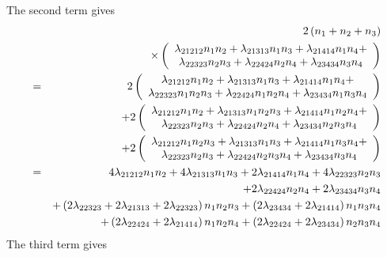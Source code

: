 \documentclass[12pt]{article}
\begin{document}
The second term gives%
\begin{eqnarray}
&&2\left( n_{1}+n_{2}+n_{3}\right)  \notag \\
&&\times \left( 
\begin{array}{c}
\lambda _{21212}n_{1}n_{2}+\lambda _{21313}n_{1}n_{3}+\lambda
_{21414}n_{1}n_{4}+ \\ 
\lambda _{22323}n_{2}n_{3}+\lambda _{22424}n_{2}n_{4}+\lambda
_{23434}n_{3}n_{4}%
\end{array}%
\right)  \notag \\
&=&2\left( 
\begin{array}{c}
\lambda _{21212}n_{1}n_{2}+\lambda _{21313}n_{1}n_{3}+\lambda
_{21414}n_{1}n_{4}+ \\ 
\lambda _{22323}n_{1}n_{2}n_{3}+\lambda _{22424}n_{1}n_{2}n_{4}+\lambda
_{23434}n_{1}n_{3}n_{4}%
\end{array}%
\right)  \notag \\
&&+2\left( 
\begin{array}{c}
\lambda _{21212}n_{1}n_{2}+\lambda _{21313}n_{1}n_{2}n_{3}+\lambda
_{21414}n_{1}n_{2}n_{4}+ \\ 
\lambda _{22323}n_{2}n_{3}+\lambda _{22424}n_{2}n_{4}+\lambda
_{23434}n_{2}n_{3}n_{4}%
\end{array}%
\right)  \notag \\
&&+2\left( 
\begin{array}{c}
\lambda _{21212}n_{1}n_{2}n_{3}+\lambda _{21313}n_{1}n_{3}+\lambda
_{21414}n_{1}n_{3}n_{4}+ \\ 
\lambda _{22323}n_{2}n_{3}+\lambda _{22424}n_{2}n_{3}n_{4}+\lambda
_{23434}n_{3}n_{4}%
\end{array}%
\right)  \notag \\
&=&4\lambda _{21212}n_{1}n_{2}+4\lambda _{21313}n_{1}n_{3}+2\lambda
_{21414}n_{1}n_{4}+4\lambda _{22323}n_{2}n_{3}  \notag \\
&&+2\lambda _{22424}n_{2}n_{4}+2\lambda _{23434}n_{3}n_{4}  \notag \\
&&+\left( 2\lambda _{22323}+2\lambda _{21313}+2\lambda _{22323}\right)
n_{1}n_{2}n_{3}+\left( 2\lambda _{23434}+2\lambda _{21414}\right)
n_{1}n_{3}n_{4}  \notag \\
&&+\left( 2\lambda _{22424}+2\lambda _{21414}\right) n_{1}n_{2}n_{4}+\left(
2\lambda _{22424}+2\lambda _{23434}\right) n_{2}n_{3}n_{4}
\end{eqnarray}%
The third term gives%
\end{document}
